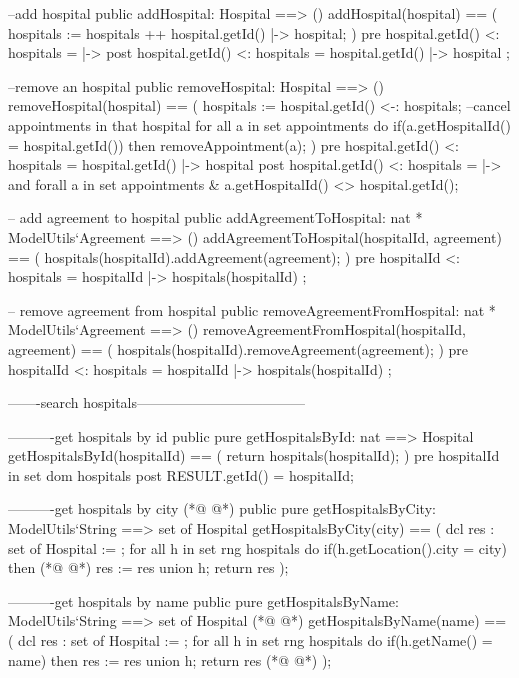 \begin{vdmpp}[breaklines=true]
  
   --add hospital
  public addHospital: Hospital ==> ()
  addHospital(hospital) == (
   hospitals := hospitals ++  { hospital.getId() |-> hospital};
  )
  pre {hospital.getId() } <: hospitals = { |-> } 
  post {hospital.getId() } <: hospitals = { hospital.getId() |-> hospital } ;
  
  --remove an hospital
  public removeHospital: Hospital ==> ()
  removeHospital(hospital) == (   
   hospitals := {hospital.getId()} <-: hospitals;
   --cancel appointments in that hospital
   for all a in set appointments do 
    if(a.getHospitalId() = hospital.getId()) then
     removeAppointment(a);
  )
   pre {hospital.getId()} <: hospitals = { hospital.getId() |-> hospital } 
  post {hospital.getId()} <: hospitals = { |-> } and 
     forall a in set appointments & a.getHospitalId() <> hospital.getId();
  
  -- add agreement to hospital
  public addAgreementToHospital: nat * ModelUtils`Agreement ==> ()
  addAgreementToHospital(hospitalId, agreement) == (
   hospitals(hospitalId).addAgreement(agreement);
  )
  pre {hospitalId} <: hospitals = { hospitalId |-> hospitals(hospitalId) };
  

  -- remove agreement from hospital
  public removeAgreementFromHospital: nat * ModelUtils`Agreement ==> ()
  removeAgreementFromHospital(hospitalId, agreement) == (
   hospitals(hospitalId).removeAgreement(agreement);
  )
  pre {hospitalId} <: hospitals = { hospitalId |-> hospitals(hospitalId) };
  
  -------search hospitals------------------------------------
 
  ----------get hospitals by id
  public pure getHospitalsById: nat ==> Hospital
   getHospitalsById(hospitalId) == (
    return hospitals(hospitalId);
   )
  pre hospitalId in set dom hospitals
  post RESULT.getId() = hospitalId;
   
  ----------get hospitals by city
(*@
\label{SafetyNetNetwork:105}
@*)
  public pure getHospitalsByCity: ModelUtils`String ==> set of Hospital
   getHospitalsByCity(city) == (
    dcl res : set of Hospital := {};
    for all h in set rng hospitals do
      if(h.getLocation().city = city) then
(*@
\label{getInstance:110}
@*)
       res := res union {h};
    return res
   );
  
  ----------get hospitals by name
  public pure getHospitalsByName: ModelUtils`String ==> set of Hospital
(*@
\label{clearInstance:116}
@*)
   getHospitalsByName(name) == (
    dcl res : set of Hospital := {};
    for all h in set rng hospitals do
      if(h.getName() = name) then
       res := res union {h};
    return res
(*@
\label{associateDoctorToHospital:122}
@*)
   );
  

\end{vdmpp}

